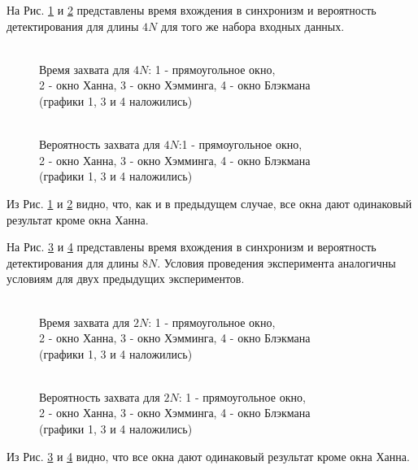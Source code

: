 На Рис. \ref{pic:dma5mhz_4fft_lockTime} и \ref{pic:dma5mhz_4fft_probDetection} представлены время вхождения в синхронизм и вероятность детектирования для длины ${4N}$
для того же набора входных данных.
\begin{figure}[h]
\center{}
	\caption{\\Время захвата для ${4N}$: 1 - прямоугольное окно,\\2 - окно Ханна, 3 - окно Хэмминга, 4 - окно Блэкмана\\(графики 1, 3 и 4 наложились)}
	\label{pic:dma5mhz_4fft_lockTime}
\end{figure}
\begin{figure}[h]
\center{}
	\caption{\\Вероятность захвата для ${4N}$:1 - прямоугольное окно,\\2 - окно Ханна, 3 - окно Хэмминга, 4 - окно Блэкмана\\(графики 1, 3 и 4 наложились)}
	\label{pic:dma5mhz_4fft_probDetection}
\end{figure}
Из Рис. \ref{pic:dma5mhz_4fft_lockTime} и \ref{pic:dma5mhz_4fft_probDetection} видно, что, как и в предыдущем случае, все окна дают одинаковый результат кроме окна Ханна.

На Рис. \ref{pic:dma5mhz_8fft_lockTime} и \ref{pic:dma5mhz_8fft_probDetection} представлены время вхождения в синхронизм и вероятность детектирования для длины ${8N}$. Условия
проведения эксперимента аналогичны условиям для двух предыдущих экспериментов.
\begin{figure}[h]
\center{}
	\caption{\\Время захвата для ${2N}$: 1 - прямоугольное окно,\\2 - окно Ханна, 3 - окно Хэмминга, 4 - окно Блэкмана\\(графики 1, 3 и 4 наложились)}
	\label{pic:dma5mhz_8fft_lockTime}
\end{figure}
\begin{figure}[h]
\center{}
	\caption{\\Вероятность захвата для ${2N}$: 1 - прямоугольное окно,\\2 - окно Ханна, 3 - окно Хэмминга, 4 - окно Блэкмана\\(графики 1, 3 и 4 наложились)}
	\label{pic:dma5mhz_8fft_probDetection}
\end{figure}
Из Рис. \ref{pic:dma5mhz_8fft_lockTime} и \ref{pic:dma5mhz_8fft_probDetection} видно, что все окна дают одинаковый результат кроме окна Ханна.

